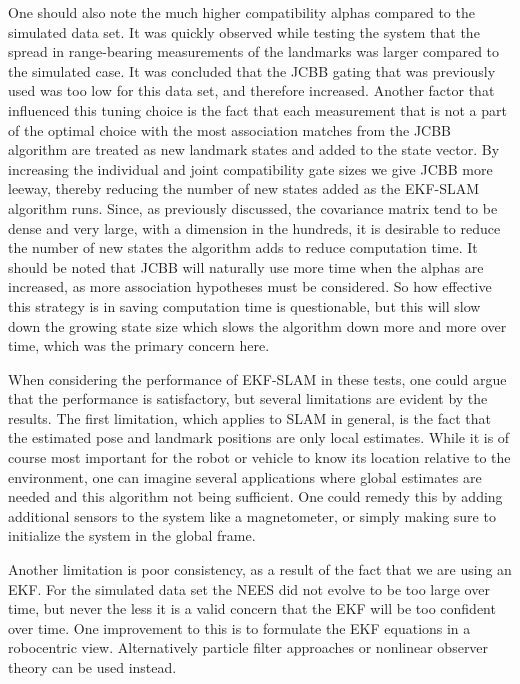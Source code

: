 One should also note the much higher compatibility alphas compared to the simulated data set. It was quickly observed while testing the system that the spread in range-bearing measurements of the landmarks was larger compared to the simulated case. It was concluded that the JCBB gating that was previously used was too low for this data set, and therefore increased. Another factor that influenced this tuning choice is the fact that each measurement that is not a part of the optimal choice with the most association matches from the JCBB algorithm are treated as new landmark states and added to the state vector. By increasing the individual and joint compatibility gate sizes we give JCBB more leeway, thereby reducing the number of new states added as the EKF-SLAM algorithm runs. Since, as previously discussed, the covariance matrix tend to be dense and very large, with a dimension in the hundreds, it is desirable to reduce the number of new states the algorithm adds to reduce computation time. It should be noted that JCBB will naturally use more time when the alphas are increased, as more association hypotheses must be considered. So how effective this strategy is in saving computation time is questionable, but this will slow down the growing state size which slows the algorithm down more and more over time, which was the primary concern here. 


When considering the performance of EKF-SLAM in these tests, one could argue that the performance is satisfactory, but several limitations are evident by the results. The first limitation, which applies to SLAM in general, is the fact that the estimated pose and landmark positions are only local estimates. While it is of course most important for the robot or vehicle to know its location relative to the environment, one can imagine several applications where global estimates are needed and this algorithm not being sufficient. One could remedy this by adding additional sensors to the system like a magnetometer, or simply making sure to initialize the system in the global frame. 

Another limitation is poor consistency, as a result of the fact that we are using an EKF. For the simulated data set the NEES did not evolve to be too large over time, but never the less it is a valid concern that the EKF will be too confident over time. One improvement to this is to formulate the EKF equations in a robocentric view. Alternatively particle filter approaches or nonlinear observer theory can be used instead. 

